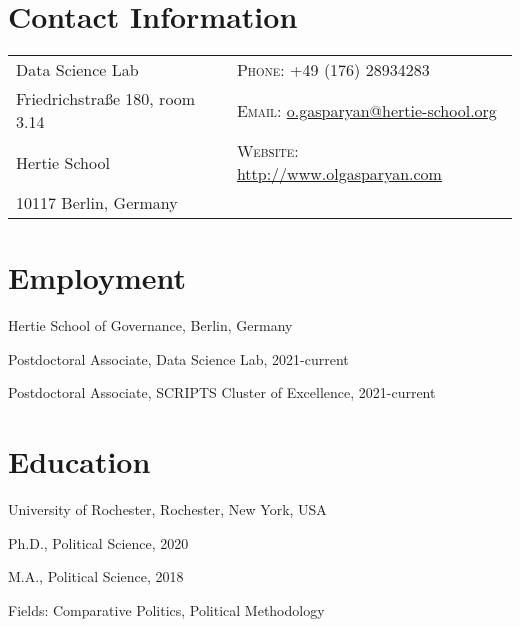 \documentclass[margin,line,12pt]{res}
\newenvironment{list1}{
  \begin{list}{\ding{113}}{%
      \setlength{\itemsep}{0in}
      \setlength{\parsep}{0in} \setlength{\parskip}{0in}
      \setlength{\topsep}{0in} \setlength{\partopsep}{0in}
      \setlength{\leftmargin}{0.17in}}}{\end{list}}
\begin{document}

\begin{resume}
\section{\sc Contact Information}
\vspace{.05in}
\begin{tabular}{@{}p{2.5in}p{4in}}
Data Science Lab                 & \textsc{Phone}: +49 (176) 28934283 \\
  Friedrichstraße 180, room 3.14  & \textsc{Email}: \href{mailto:o.gasparyan@hertie-school.org}{o.gasparyan@hertie-school.org} \\
Hertie School             & \textsc{Website}: \href{http://www.olgasparyan.com}{http://www.olgasparyan.com} \\
10117 Berlin, Germany        \\
\end{tabular}

\section{\sc Employment}
{Hertie School of Governance}, Berlin, Germany\\
\vspace*{-.1in}
\begin{list1}
	\item[] Postdoctoral Associate, Data Science Lab, 2021-current
	\item[] Postdoctoral Associate, SCRIPTS Cluster of Excellence, 2021-current

\end{list1}

\section{\sc Education}
{University of Rochester}, Rochester, New York, USA\\
\vspace*{-.1in}
\begin{list1}
\item[] Ph.D., Political Science, 2020 
\item[] M.A., Political Science, 2018 
\item[] Fields: Comparative Politics, Political Methodology 
\end{list1}


\end{resume}
\end{document}
